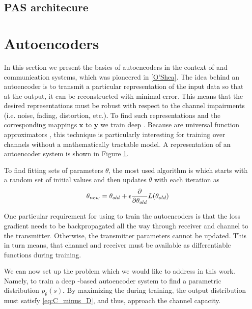 \subsection{PAS architecure}

\section{Autoencoders}
In this section we present the basics of autoencoders in the context of  and communication systems, which was pioneered in \ref{O’Shea}. The idea behind an autoencoder is to transmit a particular representation of the input data so that at the output, it can be reconstructed with minimal error. This means that the desired representations must be robust with respect to the channel impairments (i.e. noise, fading, distortion, etc.). To find such representations and the corresponding mappings $\textbf{x}$ to $\textbf{y}$ we train deep . Because  are universal function approximators \cite{HORNIK1989359}, this technique is particularly interesting for training over channels without a mathematically tractable model. A representation of an autoencoder system is shown in Figure \ref{}.

To find fitting sets of parameters \textbf{$\theta$}, the most used algorithm is  which starts with a random set of initial values and then updates \textbf{$\theta$} with each iteration as
\begin{align}
	\theta_{new} = \theta_{old} + \epsilon \pdv{\theta_{old}} L(\theta_{old})
\end{align}

One particular requirement for using  to train the autoencoders is that the loss gradient needs to be backpropagated
all the way through receiver and channel to the transmitter. Otherwise, the transmitter parameters cannot be updated. This in turn means, that channel and receiver must be available as differentiable functions during training.

We can now set up the problem which we would like to address in this work. Namely, to train a deep -based autoencoder system to find a parametric distribution $p_{\theta}(s)$. By maximizing the  during training, the output distribution must satisfy \ref{eq:C_minus_D}, and thus, approach the channel capacity.